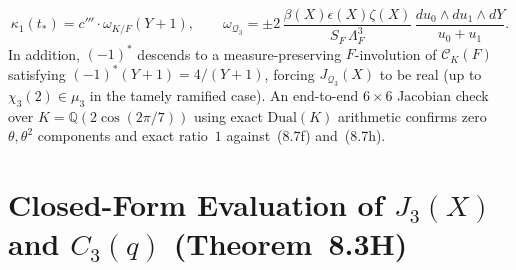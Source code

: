 \documentclass[11pt,letterpaper]{article}
\begin{document}
\begin{enumerate}[1.]
\[
\kappa_1(t_*)=c'''\cdot\omega_{K/F}(Y+1),\qquad
\omega_{\mathcal{Q}_3}=\pm 2\,\frac{\beta(X)\epsilon(X)\zeta(X)}{S_F\,\Lambda_F^3}\,\frac{du_0\wedge du_1\wedge dY}{u_0+u_1}.
\]
In addition, $(-1)^*$ descends to a measure-preserving $F$-involution of $\mathcal{C}_K(F)$ satisfying $(-1)^*(Y+1)=4/(Y+1)$, forcing $J_{\mathcal{Q}_3}(X)$ to be real (up to $\chi_3(2)\in\mu_3$ in the tamely ramified case). An end-to-end $6\times 6$ Jacobian check over $K=\mathbb{Q}(2\cos(2\pi/7))$ using exact $\mathrm{Dual}(K)$ arithmetic confirms zero $\theta,\theta^2$ components and exact ratio~$1$ against~(8.7f) and~(8.7h).
\end{enumerate}

\section{\texorpdfstring{Closed-Form Evaluation of $J_3(X)$ and $C_3(q)$ (Theorem~8.3H)}{Closed-Form Evaluation of J3(X) and C3(q) (Theorem 8.3H)}}
\end{document}
